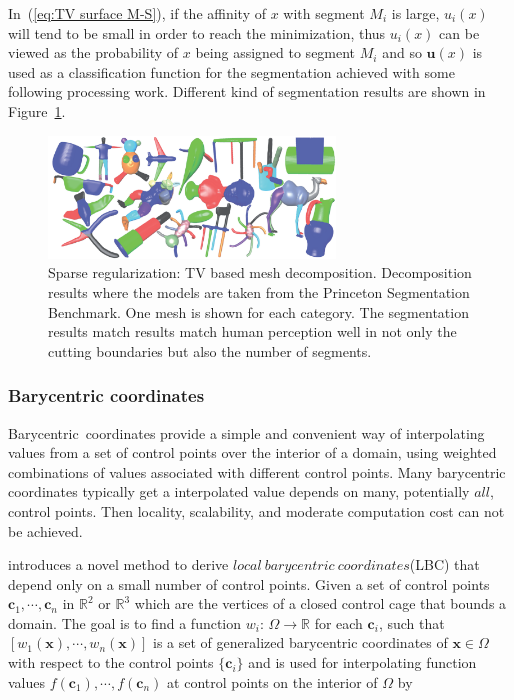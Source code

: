 In~(\ref{eq:TV surface M-S}), if the affinity of $x$ with segment $M_{i}$ is large, $u_{i}(x)$ will tend to be small in order to reach the minimization,
thus $u_{i}(x)$ can be viewed as the probability of $x$ being assigned to segment $M_{i}$ and
so $\mathbf{u}(x)$ is used as a classification function for the segmentation achieved with some following processing work.
Different kind of segmentation results are shown in Figure~\ref{fig:segmentation}.


\begin{figure}[ht]
  \centering
  \includegraphics[width=3in]{images/segmentation}
  \caption{Sparse regularization: TV based mesh decomposition\cite{zhang2012variational}. Decomposition results where the models are taken from the Princeton Segmentation Benchmark\cite{chen2009benchmark}. One mesh is shown for each category. The segmentation results match results match human perception well in not only the cutting boundaries but also the number of segments.}
  \label{fig:segmentation}
\end{figure}


\subsubsection{Barycentric coordinates}
\label{subsubsec:Barycentric coordinates}

Barycentric~coordinates provide a simple and convenient way of interpolating values from a set of control points over the interior of a domain, using weighted combinations of values associated with different control points.
Many barycentric coordinates typically get a interpolated value depends on many, potentially $all$, control points.
Then locality, scalability, and moderate computation cost can not be achieved.

\cite{zhang2014local} introduces a novel method to derive $local~barycentric~coordinates$(LBC) that depend only on a small number of control points.
Given a set of control points $\mathbf{c}_1, \cdots, \mathbf{c}_n$ in $\mathbb{R}^2$ or  $\mathbb{R}^3$ which are the vertices of a closed control cage that bounds a domain.
The goal is to find a function $w_{i}$: $\Omega\rightarrow\mathbb{R}$ for each $\mathbf{c}_{i}$, such that $[w_1(\mathbf{x}), \cdots, w_n(\mathbf{x})]$ is a set of generalized barycentric coordinates of $\mathbf{x}\in\Omega$ with respect to the control points $\{\mathbf{c}_{i}\}$ and is used for interpolating function values $f(\mathbf{c}_1), \cdots, f(\mathbf{c}_n)$ at control points on the interior of $\Omega$ by

